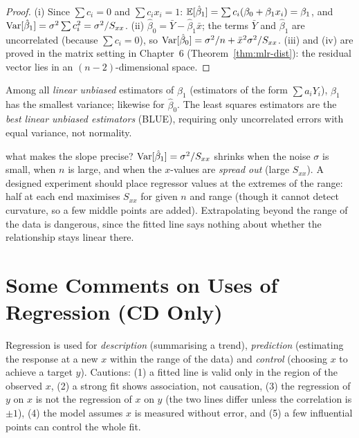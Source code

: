 \begin{proof}
(i) Since $\sum c_i=0$ and $\sum c_ix_i=1$: $\mathbb{E}[\hat\beta_1]=\sum c_i(\beta_0+\beta_1x_i)=\beta_1$, and $\operatorname{Var}[\hat\beta_1]=\sigma^2\sum c_i^2=\sigma^2/S_{xx}$. (ii) $\hat\beta_0=\bar{Y}-\hat\beta_1\bar{x}$; the terms $\bar{Y}$ and $\hat\beta_1$ are uncorrelated (because $\sum c_i=0$), so $\operatorname{Var}[\hat\beta_0]=\sigma^2/n+\bar{x}^2\sigma^2/S_{xx}$. (iii) and (iv) are proved in the matrix setting in Chapter~6 (Theorem~\ref{thm:mlr-dist}): the residual vector lies in an $(n-2)$-dimensional space.
\end{proof}

\begin{theorem}\label{thm:gm1}
Among all \emph{linear unbiased} estimators of $\beta_1$ (estimators of the form $\sum a_iY_i$), $\hat\beta_1$ has the smallest variance; likewise for $\hat\beta_0$. The least squares estimators are the \emph{best linear unbiased estimators} (BLUE), requiring only uncorrelated errors with equal variance, not normality.
\end{theorem}

\begin{interview}{what makes the slope precise?}
$\operatorname{Var}[\hat\beta_1]=\sigma^2/S_{xx}$ shrinks when the noise $\sigma$ is small, when $n$ is large, and when the $x$-values are \emph{spread out} (large $S_{xx}$). A designed experiment should place regressor values at the extremes of the range: half at each end maximises $S_{xx}$ for given $n$ and range (though it cannot detect curvature, so a few middle points are added). Extrapolating beyond the range of the data is dangerous, since the fitted line says nothing about whether the relationship stays linear there.
\end{interview}

\section{Some Comments on Uses of Regression (CD Only)}

Regression is used for \emph{description} (summarising a trend), \emph{prediction} (estimating the response at a new $x$ within the range of the data) and \emph{control} (choosing $x$ to achieve a target $y$). Cautions: (1) a fitted line is valid only in the region of the observed $x$, (2) a strong fit shows association, not causation, (3) the regression of $y$ on $x$ is not the regression of $x$ on $y$ (the two lines differ unless the correlation is $\pm1$), (4) the model assumes $x$ is measured without error, and (5) a few influential points can control the whole fit.

